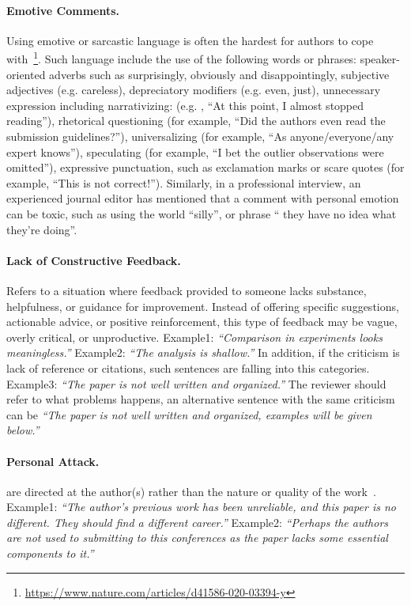 \paragraph{Emotive Comments.}  
Using emotive or sarcastic language is often the hardest for authors to cope with~\footnote{\url{https://www.nature.com/articles/d41586-020-03394-y}}. 
Such language include the use of the following words or phrases: speaker-oriented adverbs such as surprisingly, obviously and disappointingly, subjective adjectives (e.g. careless), depreciatory modifiers (e.g. even, just), unnecessary expression including narrativizing: (e.g. , ``At this point, I almost stopped reading''), rhetorical questioning (for example, ``Did the authors even read the submission guidelines?''), universalizing (for example, ``As anyone/everyone/any expert knows''), speculating (for example, ``I bet the outlier observations were omitted''), expressive punctuation, such as exclamation marks or scare quotes (for example, ``This is not correct!'').
Similarly, in a professional interview, an experienced journal editor has mentioned that a comment with personal emotion can be toxic, such as using the world ``silly'', or phrase `` they have no idea what they’re doing''. 

\paragraph{Lack of Constructive Feedback.} 
Refers to a situation where feedback provided to someone lacks substance, helpfulness, or guidance for improvement.
Instead of offering specific suggestions, actionable advice, or positive reinforcement, this type of feedback may be vague, overly critical, or unproductive. 
Example1: \textit{``Comparison in experiments looks meaningless.''}
Example2: \textit{``The analysis is shallow.''}
In addition, if the criticism is lack of reference or citations, such sentences are falling into this categories. Example3: \textit{``The paper is not well written and organized.''} 
The reviewer should refer to what problems happens, an alternative sentence with the same criticism can be \textit{``The paper is not well written and organized, examples will be given below.''}

\paragraph{Personal Attack.} 
are directed at the author(s) rather than the nature or quality of the work~\cite{silbiger2019unprofessional}.  Example1: \textit{``The author’s previous work has been unreliable, and this paper is no different. They should find a different career.''} Example2: \textit{``Perhaps the authors are not used to submitting to this conferences as the paper lacks some essential components to it.''}


